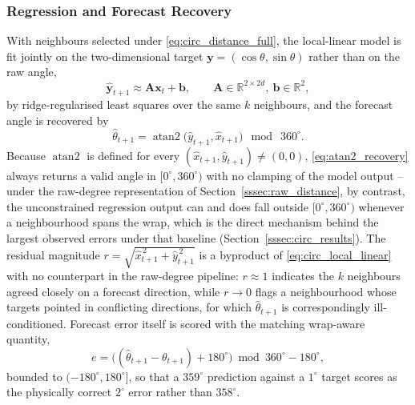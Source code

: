 \documentclass[letterpaper, 10pt, conference]{IEEEtran}
\begin{document}
    \subsubsection{Regression and Forecast Recovery}
    \label{sssec:regression_recovery}

        With neighbours selected under \eqref{eq:circ_distance_full}, the
        local-linear model is fit jointly on the two-dimensional target
        $\mathbf{y}=(\cos\theta,\sin\theta)$ rather than on the raw angle,
        \begin{equation}
            \widehat{\mathbf{y}}_{t+1} \approx \mathbf{A}\mathbf{x}_t+\mathbf{b},
            \qquad \mathbf{A}\in\mathbb{R}^{2\times 2d},\ \mathbf{b}\in\mathbb{R}^{2},
            \label{eq:circ_local_linear}
        \end{equation}
        by ridge-regularised least squares over the same $k$ neighbours, and
        the forecast angle is recovered by
        \begin{equation}
            \widehat{\theta}_{t+1} = \operatorname{atan2}\!\bigl(\widehat{y}_{t+1},\widehat{x}_{t+1}\bigr)\ \bmod\ 360^{\circ}.
            \label{eq:atan2_recovery}
        \end{equation}
        Because $\operatorname{atan2}$ is defined for every
        $(\widehat{x}_{t+1},\widehat{y}_{t+1})\neq(0,0)$,
        \eqref{eq:atan2_recovery} always returns a valid angle in
        $[0^{\circ},360^{\circ})$ with no clamping of the model output --
        under the raw-degree representation of Section~\ref{sssec:raw_distance},
        by contrast, the unconstrained regression output can and does fall
        outside $[0^{\circ},360^{\circ})$ whenever a neighbourhood spans the
        wrap, which is the direct mechanism behind the largest observed
        errors under that baseline (Section~\ref{sssec:circ_results}). The
        residual magnitude $r=\sqrt{\widehat{x}_{t+1}^{\,2}+\widehat{y}_{t+1}^{\,2}}$
        is a byproduct of \eqref{eq:circ_local_linear} with no counterpart in
        the raw-degree pipeline: $r\approx 1$ indicates the $k$ neighbours
        agreed closely on a forecast direction, while $r\to 0$ flags a
        neighbourhood whose targets pointed in conflicting directions, for
        which $\widehat{\theta}_{t+1}$ is correspondingly ill-conditioned.
        Forecast error itself is scored with the matching wrap-aware
        quantity,
        \begin{equation}
            e = \bigl((\widehat{\theta}_{t+1}-\theta_{t+1}) + 180^{\circ}\bigr) \bmod 360^{\circ} - 180^{\circ},
            \label{eq:circular_error}
        \end{equation}
        bounded to $(-180^{\circ},180^{\circ}]$, so that a $359^{\circ}$
        prediction against a $1^{\circ}$ target scores as the physically
        correct $2^{\circ}$ error rather than $358^{\circ}$.
\end{document}
